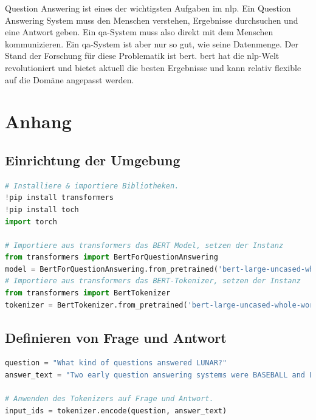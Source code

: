 \documentclass[
        ngerman,
        paper=a4,
        numbers=noendperiod,
]{scrreprt}
\begin{document}
Question Answering ist eines der wichtigsten Aufgaben im \ac{nlp}. Ein Question Answering System muss den Menschen verstehen, Ergebnisse durchsuchen und eine Antwort geben. Ein \ac{qa}-System muss also direkt mit dem Menschen kommunizieren. Ein \ac{qa}-System ist aber nur so gut, wie seine Datenmenge. Der Stand der Forschung für diese Problematik ist \ac{bert}. \ac{bert} hat die \ac{nlp}-Welt revolutioniert und bietet aktuell die besten Ergebnisse und kann relativ flexible auf die Domäne angepasst werden.











\appendix 
\chapter{Anhang}
\label{chapter:Anhang}%


\section{Einrichtung der Umgebung}
\label{section:EINR} %
\begin{lstlisting}[language=Python]
# Installiere & importiere Bibliotheken.
!pip install transformers
!pip install toch
import torch

# Importiere aus transformers das BERT Model, setzen der Instanz
from transformers import BertForQuestionAnswering
model = BertForQuestionAnswering.from_pretrained('bert-large-uncased-whole-word-masking-finetuned-squad')
# Importiere aus transformers das BERT-Tokenizer, setzen der Instanz
from transformers import BertTokenizer
tokenizer = BertTokenizer.from_pretrained('bert-large-uncased-whole-word-masking-finetuned-squad')
\end{lstlisting}

\section{Definieren von Frage und Antwort}
\label{section:FRA} %
\begin{lstlisting}[language=Python]
question = "What kind of questions answered LUNAR?"
answer_text = "Two early question answering systems were BASEBALL and LUNAR. BASEBALL answered questions about the US baseball league over a period of one year. LUNAR, in turn, answered questions about the geological analysis of rocks returned by the Apollo moon missions. Both question answering systems were very effective in their chosen domains."

# Anwenden des Tokenizers auf Frage und Antwort.
input_ids = tokenizer.encode(question, answer_text)
\end{lstlisting}
\end{document}
